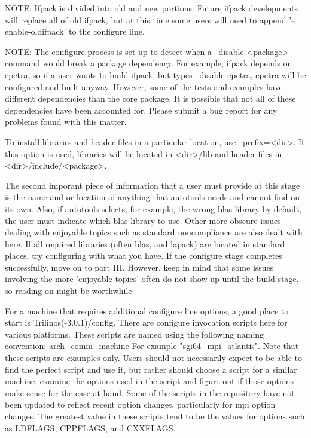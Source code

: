 \documentclass[12pt,relax]{SANDreport}
\begin{document}
NOTE: Ifpack is divided into old and new portions.  Future ifpack developments 
will replace all of old ifpack, but at this time some users will need to append
'--enable-oldifpack' to the configure line.

NOTE: The configure process is set up to detect when a --disable-<package> 
command would break a package dependency.  For example, ifpack depends on 
epetra, so if a user wants to build ifpack, but types --disable-epetra, epetra 
will be configured and built anyway.  However, some of the tests and examples 
have different dependencies than the core package.  It is possible that not 
all of these dependencies have been accounted for.  Please submit a bug report 
for any problems found with this matter.

	To install libraries and header files in a particular location, use 
--prefix=<dir>.  If this option is used, libraries will be located in 
<dir>/lib and header files in <dir>/include/<package>.

	The second imporant piece of information that a user must provide at 
this stage is the name and or location of anything that autotools needs and 
cannot find on its own.  Also, if autotools selects, for example, the wrong 
blas library by default, the user must indicate which blas library to use.  
Other more obscure issues dealing with enjoyable topics such as standard 
noncompliance are also dealt with here.  If all required libraries (often 
blas, and lapack) are located in standard places, try configuring with what 
you have.  If the configure stage completes successfully, move on to part 
III.  However, keep in mind that some issues involving the more 'enjoyable topics' often do not show up until the build stage, so reading on might be 
worthwhile.

	For a machine that requires additional configure line options, a good 
place to start is Trilinos(-3.0.1)/config.  There are configure invocation 
scripts here for various platforms.  These scripts are named using the 
following naming convention:
arch_comm_machine
For example "sgi64_mpi_atlantis".  Note that these scripts are examples only.  
Users should not necessarily expect to be able to find the perfect script and 
use it, but rather should choose a script for a similar machine, examine the 
options used in the script and figure out if those options make sense for the 
case at hand.  Some of the scripts in the repository have not been updated to 
reflect recent option changes, particularly for mpi option changes.  The 
greatest value in these scripts tend to be the values for options such as 
LDFLAGS, CPPFLAGS, and CXXFLAGS.  
\end{document}
